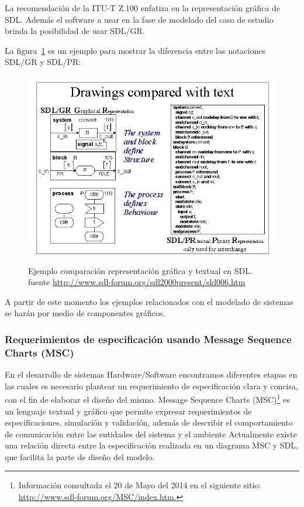 La recomendaci\'on de la ITU-T Z.100 enfatiza en la representaci\'on gr\'afica 
de SDL. Adem\'as el software a usar en la fase de modelado del caso de estudio 
brinda la posibilidad de usar SDL/GR. 

La figura~\ref{fig:SDLGR_PR} es un ejemplo para mostrar la diferencia entre las notaciones SDL/GR y SDL/PR:

\begin{figure}[H]
  \centering
  \includegraphics[scale=0.6]{./images/EjemploSDLGR_SDLPR.jpg}
  \caption{Ejemplo comparaci\'on representaci\'on gr\'afica y textual en 
SDL. fuente \url{http://www.sdl-forum.org/sdl2000present/sld006.htm}}
  \label{fig:SDLGR_PR}
\end{figure}

A partir de este momento los ejemplos relacionados con el modelado de sistemas 
se har\'an por medio de componentes gr\'aficos.

\subsubsection{Requerimientos de especificaci\'on usando Message Sequence Charts 
(MSC)}

En el desarrollo de sistemas Hardware/Software encontramos diferentes etapas en 
las cuales es necesario plantear un requerimiento de especificaci\'on clara y 
concisa, con el fin de elaborar el dise\~no del mismo. Message Sequence Charts 
(MSC)\footnote{Informaci\'on consultada el 20 de Mayo del 2014 en el siguiente 
sitio: \url{http://www.sdl-forum.org/MSC/index.htm.}} es un lenguaje textual y 
gr\'afico que permite expresar requerimientos de especificaciones, simulaci\'on 
y validaci\'on, adem\'as de describir el comportamiento de comunicaci\'on entre las entidades del sistema y el ambiente \cite{Ebner} Actualmente existe una relaci\'on directa entre la 
especificaci\'on realizada en un diagrama MSC y SDL, que facilita la parte de 
dise\~no del modelo. 

